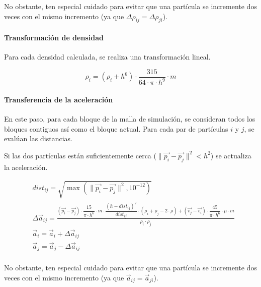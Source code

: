 No obstante, ten especial cuidado para evitar que una partícula se incremente dos
veces con el mismo incremento (ya que $\Delta \rho_{ij} = \Delta \rho_{ji}$).

\paragraph{Transformación de densidad}
Para cada densidad calculada, se realiza una transformación lineal.

\[
\rho_i = (\rho_i + h^6) \cdot \frac{315}{64 \cdot \pi \cdot h^9} \cdot m
\]

\paragraph{Transferencia de la aceleración}
En este paso, para cada bloque de la malla de simulación, se consideran todos 
los bloques contiguos así como el bloque actual. Para cada par de partículas
$i$ y $j$, se evalúan las distancias.

Si las dos partículas están suficientemente cerca 
($\|\vec{p_i} - \vec{p_j}\|^2 < h^2$) se actualiza la aceleración.

\[
\begin{split}
& dist_{ij} = \sqrt{\max(\|\vec{p_i} - \vec{p_j}\|^2, 10^{-12})} \\
& \Delta \vec{a}_{ij} = 
  \frac{
    (\vec{p_i} - \vec{p_j}) \cdot \dfrac{15}{\pi \cdot h^6} \cdot m \cdot 
    \dfrac{(h - dist_{ij})^2}{dist_{ij}} \cdot (\rho_i + \rho_j - 2 \cdot \rho) +
    (\vec{v_j} - \vec{v_i}) \cdot \dfrac{45}{\pi \cdot h^6} \cdot \mu \cdot m
  }{
    \rho_i \cdot \rho_j    
  } \\
& \vec{a}_i = \vec{a}_i + \Delta \vec{a}_{ij}\\
& \vec{a}_j = \vec{a}_j - \Delta \vec{a}_{ij}\\
\end{split}
\]

No obstante, ten especial cuidado para evitar que una partícula se incremente dos
veces con el mismo incremento (ya que $\vec{a}_{ij} = \vec{a}_{ji}$).
